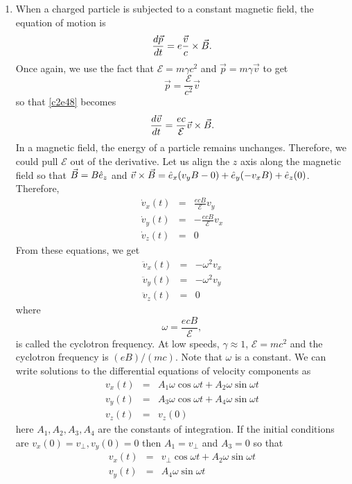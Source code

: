 \begin{enumerate}
\item When a charged particle is subjected to a constant magnetic field, the
equation of motion is
\begin{equation}\label{c2e49}
\frac{d{\vec{p}}}{d{t}} = e\frac{\vec{v}}{c} \times \vec{B}.
\end{equation}
Once again, we use the fact that $\mathcal{E} = m\gamma c^2$ and $\vec{p} = 
m\gamma\vec{v}$ to get
\[
\vec{p} = \frac{\mathcal{E}}{c^2}\vec{v}
\]
so that \eqref{c2e48} becomes
\[
\frac{d{\vec{v}}}{d{t}} = \frac{ec}{\mathcal{E}}\vec{v} \times \vec{B}.
\]
In a magnetic field, the energy of a particle remains unchanges. Therefore, we 
could pull $\mathcal{E}$ out of the derivative. Let us align the $z$ axis along
the magnetic field so that $\vec{B} = B\hat{e}_{z}$ and $\vec{v} \times \vec{B} = 
\hat{e}_{x}(v_yB - 0) + \hat{e}_{y}(-v_xB) + \hat{e}_{z}(0)$. Therefore,
\begin{eqnarray*}
\dot{v}_x(t) &=& \frac{ecB}{\mathcal{E}}v_y \\
\dot{v}_y(t) &=& -\frac{ecB}{\mathcal{E}}v_x \\
\dot{v}_z(t) &=& 0
\end{eqnarray*}
From these equations, we get
\begin{eqnarray*}
\ddot{v}_x(t) &=& -\omega^2 v_x \\
\ddot{v}_y(t) &=& -\omega^2 v_y \\
\ddot{v}_z(t) &=& 0
\end{eqnarray*}
where
\begin{equation}\label{c3e50}
\omega = \frac{ecB}{\mathcal{E}},
\end{equation}
is called the cyclotron frequency. At low speeds, $\gamma \approx 1$, $\mathcal{E}
= mc^2$ and the cyclotron frequency is $(eB)/(mc)$. Note that $\omega$ is a 
constant. We can write solutions to the differential equations of velocity
components as
\begin{eqnarray*}
v_x(t) &=& A_1\omega\cos\omega t + A_2\omega\sin\omega t \\
v_y(t) &=& A_3\omega\cos\omega t + A_4\omega\sin\omega t \\
v_z(t) &=& v_z(0)
\end{eqnarray*}
here $A_1, A_2, A_3, A_4$ are the constants of integration. If the initial
conditions are $v_x(0) = v_{\perp}, v_y(0) = 0$ then $A_1 = v_{\perp}$ and 
$A_3 = 0$ so that
\begin{eqnarray*}
v_x(t) &=& v_\perp\cos\omega t + A_2\omega\sin\omega t \\
v_y(t) &=& A_4\omega\sin\omega t \\

\end{eqnarray*}
\end{enumerate}
